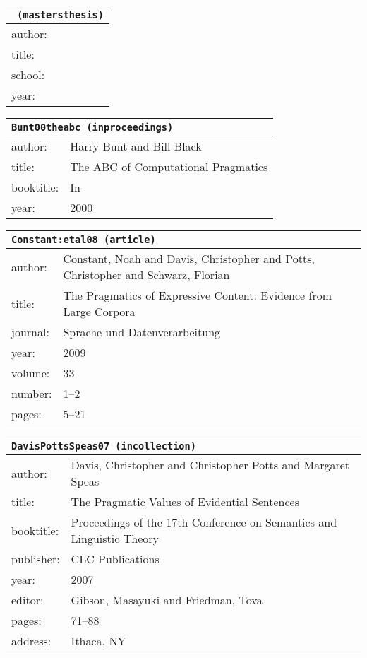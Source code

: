 \documentclass{article}
\begin{document}
\begin{tabular}{p{}p{}}
\multicolumn{2}{l}{\texttt{ (mastersthesis)}}\\
\hline
author: & \\
title: & \\
school: & \\
year: & \\
\end{tabular}

\bigskip

\begin{tabular}{p{}p{}}
\multicolumn{2}{l}{\texttt{Bunt00theabc (inproceedings)}}\\
\hline
author: & Harry Bunt and Bill Black\\
title: & The ABC of Computational Pragmatics\\
booktitle: & In\\
year: & 2000\\
\end{tabular}

\bigskip

\begin{tabular}{p{}p{}}
\multicolumn{2}{l}{\texttt{Constant:etal08 (article)}}\\
\hline
author: & Constant, Noah and Davis, Christopher and Potts, Christopher and Schwarz, Florian\\
title: & The Pragmatics of Expressive Content: Evidence from Large Corpora\\
journal: & Sprache und Datenverarbeitung\\
year: & 2009\\
volume: & 33\\
number: & 1--2\\
pages: & 5--21\\
\end{tabular}

\bigskip

\begin{tabular}{p{}p{}}
\multicolumn{2}{l}{\texttt{DavisPottsSpeas07 (incollection)}}\\
\hline
author: & Davis, Christopher and Christopher Potts and Margaret Speas\\
title: & The Pragmatic Values of Evidential Sentences\\
booktitle: & Proceedings of the 17th Conference on Semantics and Linguistic Theory\\
publisher: & CLC Publications\\
year: & 2007\\
editor: & Gibson, Masayuki and Friedman, Tova\\
pages: & 71--88\\
address: & Ithaca, NY\\
\end{tabular}
\end{document}
